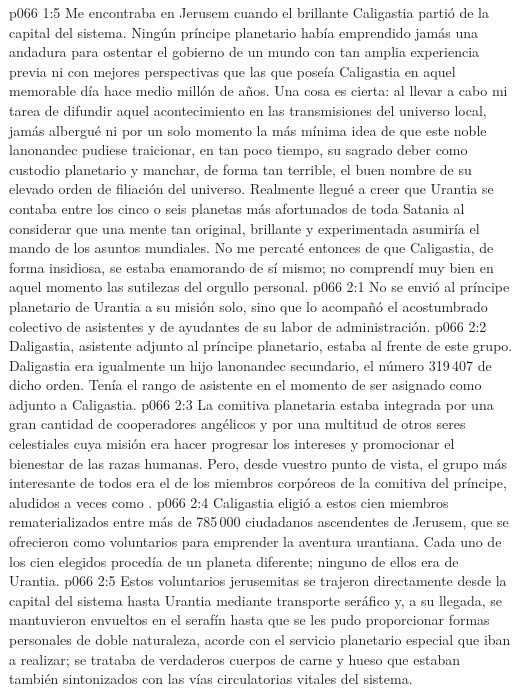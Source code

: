 \vs p066 1:5 Me encontraba en Jerusem cuando el brillante Caligastia partió de la capital del sistema. Ningún príncipe planetario había emprendido jamás una andadura para ostentar el gobierno de un mundo con tan amplia experiencia previa ni con mejores perspectivas que las que poseía Caligastia en aquel memorable día hace medio millón de años. Una cosa es cierta: al llevar a cabo mi tarea de difundir aquel acontecimiento en las transmisiones del universo local, jamás albergué ni por un solo momento la más mínima idea de que este noble lanonandec pudiese traicionar, en tan poco tiempo, su sagrado deber como custodio planetario y manchar, de forma tan terrible, el buen nombre de su elevado orden de filiación del universo. Realmente llegué a creer que Urantia se contaba entre los cinco o seis planetas más afortunados de toda Satania al considerar que una mente tan original, brillante y experimentada asumiría el mando de los asuntos mundiales. No me percaté entonces de que Caligastia, de forma insidiosa, se estaba enamorando de sí mismo; no comprendí muy bien en aquel momento las sutilezas del orgullo personal.
\vs p066 2:1 No se envió al príncipe planetario de Urantia a su misión solo, sino que lo acompañó el acostumbrado colectivo de asistentes y de ayudantes de su labor de administración.
\vs p066 2:2 Daligastia, asistente adjunto al príncipe planetario, estaba al frente de este grupo. Daligastia era igualmente un hijo lanonandec secundario, el número 319\,407 de dicho orden. Tenía el rango de asistente en el momento de ser asignado como adjunto a Caligastia.
\vs p066 2:3 La comitiva planetaria estaba integrada por una gran cantidad de cooperadores angélicos y por una multitud de otros seres celestiales cuya misión era hacer progresar los intereses y promocionar el bienestar de las razas humanas. Pero, desde vuestro punto de vista, el grupo más interesante de todos era el de los miembros corpóreos de la comitiva del príncipe, aludidos a veces como .
\vs p066 2:4 \pc Caligastia eligió a estos cien miembros rematerializados entre más de 785\,000 ciudadanos ascendentes de Jerusem, que se ofrecieron como voluntarios para emprender la aventura urantiana. Cada uno de los cien elegidos procedía de un planeta diferente; ninguno de ellos era de Urantia.
\vs p066 2:5 Estos voluntarios jerusemitas se trajeron directamente desde la capital del sistema hasta Urantia mediante transporte seráfico y, a su llegada, se mantuvieron envueltos en el serafín hasta que se les pudo proporcionar formas personales de doble naturaleza, acorde con el servicio planetario especial que iban a realizar; se trataba de verdaderos cuerpos de carne y hueso que estaban también sintonizados con las vías circulatorias vitales del sistema.

